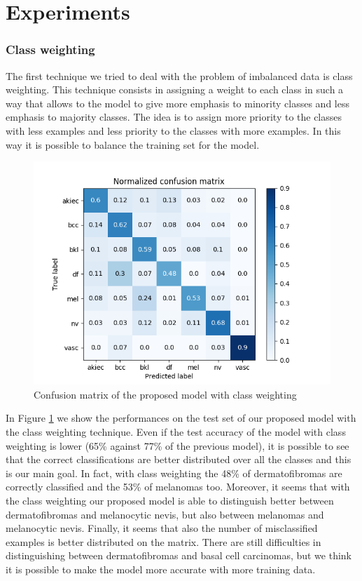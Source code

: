 \section{Experiments} \label{experiments}
		
	\subsubsection{Class weighting}
	
		The first technique we tried to deal with the problem of imbalanced data is class weighting. This technique consists in assigning a weight to each class in such a way that allows to the model to give more emphasis to minority classes and less emphasis to majority classes. The idea is to assign more priority to the classes with less examples and less priority to the classes with more examples. In this way it is possible to balance the training set for the model. 
		
		\begin{figure}[H]
			\centering
			\includegraphics[width=15cm]{images/secondMatrix.png}
			\caption{Confusion matrix of the proposed model with class weighting}
			\label{fig:second-matrix}
		\end{figure}
		
		In Figure \ref{fig:second-matrix} we show the performances on the test set of our proposed model with the class weighting technique.
		Even if the test accuracy of the model with class weighting is lower (65\% against 77\% of the previous model), it is possible to see that the correct classifications are better distributed over all the classes and this is our main goal. In fact, with class weighting the 48\% of dermatofibromas are correctly classified and the 53\% of melanomas too. Moreover, it seems that with the class weighting our proposed model is able to distinguish better between dermatofibromas and melanocytic nevis, but also between melanomas and melanocytic nevis. Finally, it seems that also the number of misclassified examples is better distributed on the matrix. There are still difficulties in distinguishing between dermatofibromas and basal cell carcinomas, but we think it is possible to make the model more accurate with more training data.
		
